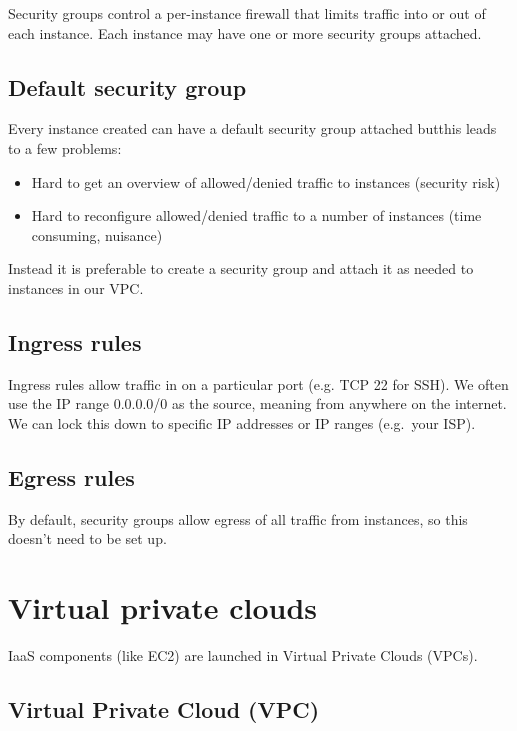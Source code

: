 Security groups control a per-instance firewall that limits traffic into or out of each instance.
Each instance may have one or more security groups attached.

\subsection{Default security group}

Every instance created can have a default security group attached butthis leads to a few problems:

\begin{itemize}
\item
  Hard to get an overview of allowed/denied traffic to instances
  (security risk)
\item
  Hard to reconfigure allowed/denied traffic to a number of instances
  (time consuming, nuisance)
\end{itemize}

Instead it is preferable to create a security group and attach it as needed to instances in our VPC.

\subsection{Ingress rules}\label{sec:ingress-rules}

Ingress rules allow traffic in on a particular port (e.g. TCP 22 for SSH). 
We often use the IP range 0.0.0.0/0 as the source, meaning from anywhere on the internet.
We can lock this down to specific IP addresses or IP ranges (e.g.~your ISP). 

\subsection{Egress rules}\label{sec:egress-rules}

By default, security groups allow egress of all traffic from instances, so this doesn't need to be set up.

\section{Virtual private clouds}
\label{sec:virtual-private-clouds}

IaaS components (like EC2) are launched in Virtual Private Clouds (VPCs).

\subsection{Virtual Private Cloud (VPC)}

